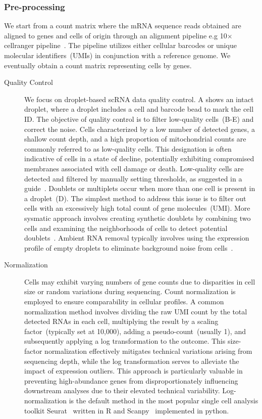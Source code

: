 \subsubsection{Pre-processing}
We start from a count matrix where the mRNA sequence reads obtained are aligned to genes and cells of origin through an alignment pipeline e.g 10$\times$ cellranger pipeline~\citep{zheng2017massively}. The pipeline utilizes either cellular barcodes or unique molecular identifiers~(UMIs) in conjunction with a reference genome. We eventually obtain a count matrix representing cells by genes.
\begin{description}
	\item[Quality Control]
	We focus on droplet-based scRNA data quality control. A shows an intact droplet, where a droplet includes a cell and barcode bead to mark the cell ID. The objective of quality control is to filter low-quality cells~(B-E) and correct the noise. Cells characterized by a low number of detected genes, a shallow count depth, and a high proportion of mitochondrial counts are commonly referred to as low-quality cells. This designation is often indicative of cells in a state of decline, potentially exhibiting compromised membranes associated with cell damage or death. Low-quality cells are detected and filtered by manually setting thresholds, as suggested in a guide~\citep{luecken2019current}. Doublets or multiplets occur when more than one cell is present in a droplet~(D). The simplest method to address this issue is to filter out cells with an excessively high total count of gene molecules~(UMI). More sysmatic approach involves creating synthetic doublets by combining two cells and examining the neighborhoods of cells to detect potential doublets~\citep{mcginnis2019doubletfinder}. Ambient RNA removal typically involves using the expression profile of empty droplets to eliminate background noise from cells~\citep{janssen2023benchambient}.


	\item[Normalization]
	Cells may exhibit varying numbers of gene counts due to disparities in cell size or random variations during sequencing. Count normalization is employed to ensure comparability in cellular profiles. A common normalization method involves dividing the raw UMI count by the total detected RNAs in each cell, multiplying the result by a scaling factor~(typically set at 10,000), adding a pseudo-count~(usually 1), and subsequently applying a log transformation to the outcome. This size-factor normalization effectively mitigates technical variations arising from sequencing depth, while the log transformation serves to alleviate the impact of expression outliers. This approach is particularly valuable in preventing high-abundance genes from disproportionately influencing downstream analyses due to their elevated technical variability. Log-normalization is the default method in the most popular single cell analysis toolkit Seurat~\citep{stuart2019seurat3} written in R and Scanpy~\citep{wolf2018scanpy} implemented in python.


\end{description}
